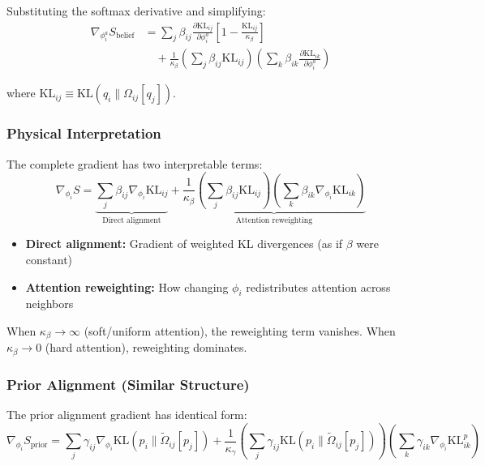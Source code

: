 \documentclass[11pt]{article}
\begin{document}
Substituting the softmax derivative and simplifying:
\begin{align}
\nabla_{\phi_i^a} S_{\mathrm{belief}} &= \sum_j \beta_{ij}\frac{\partial \mathrm{KL}_{ij}}{\partial \phi_i^a}\left[1 - \frac{\mathrm{KL}_{ij}}{\kappa_\beta}\right] \nonumber \\
&\quad + \frac{1}{\kappa_\beta}\left(\sum_j \beta_{ij}\mathrm{KL}_{ij}\right)\left(\sum_k \beta_{ik}\frac{\partial \mathrm{KL}_{ik}}{\partial \phi_i^a}\right)
\end{align}

where $\mathrm{KL}_{ij} \equiv \mathrm{KL}(q_i \| \Omega_{ij}[q_j])$.

\subsubsection*{Physical Interpretation}

The complete gradient has two interpretable terms:
\begin{equation}
\boxed{\nabla_{\phi_i} S = \underbrace{\sum_j \beta_{ij}\nabla_{\phi_i}\mathrm{KL}_{ij}}_{\text{Direct alignment}} + \underbrace{\frac{1}{\kappa_\beta}\left(\sum_j \beta_{ij}\mathrm{KL}_{ij}\right) \left(\sum_k \beta_{ik}\nabla_{\phi_i}\mathrm{KL}_{ik}\right)}_{\text{Attention reweighting}}}
\end{equation}

\begin{itemize}
\item \textbf{Direct alignment:} Gradient of weighted KL divergences (as if $\beta$ were constant)
\item \textbf{Attention reweighting:} How changing $\phi_i$ redistributes attention across neighbors
\end{itemize}

When $\kappa_\beta \to \infty$ (soft/uniform attention), the reweighting term vanishes. When $\kappa_\beta \to 0$ (hard attention), reweighting dominates.

\subsubsection*{Prior Alignment (Similar Structure)}

The prior alignment gradient has identical form:
\begin{equation}
\nabla_{\phi_i} S_{\mathrm{prior}} = \sum_j \gamma_{ij}\nabla_{\phi_i}\mathrm{KL}(p_i \| \tilde{\Omega}_{ij}[p_j]) + \frac{1}{\kappa_\gamma}\left(\sum_j \gamma_{ij}\mathrm{KL}(p_i \| \tilde{\Omega}_{ij}[p_j])\right)\left(\sum_k \gamma_{ik}\nabla_{\phi_i}\mathrm{KL}_{ik}^p\right)
\end{equation}
\end{document}
